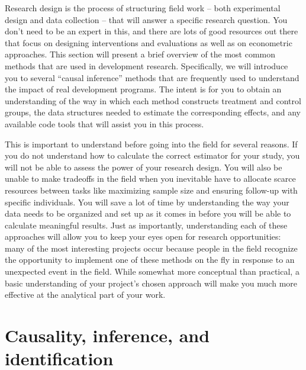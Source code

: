 
\begin{fullwidth}
Research design is the process of structuring field work
-- both experimental design and data collection --
that will answer a specific research question.
You don't need to be an expert in this,
and there are lots of good resources out there
that focus on designing interventions and evaluations
as well as on econometric approaches.
This section will present a brief overview
of the most common methods that are used in development research.
Specifically, we will introduce you to several ``causal inference'' methods
that are frequently used to understand the impact of real development programs.
The intent is for you to obtain an understanding of
the way in which each method constructs treatment and control groups,
the data structures needed to estimate the corresponding effects,
and any available code tools that will assist you in this process.

This is important to understand before going into the field for several reasons.
If you do not understand how to calculate the correct estimator for your study,
you will not be able to assess the power of your research design.
You will also be unable to make tradeoffs in the field
when you inevitable have to allocate scarce resources
between tasks like maximizing sample size
and ensuring follow-up with specific individuals.
You will save a lot of time by understanding the way
your data needs to be organized and set up as it comes in
before you will be able to calculate meaningful results.
Just as importantly, understanding each of these approaches
will allow you to keep your eyes open for research opportunities:
many of the most interesting projects occur because people in the field
recognize the opportunity to implement one of these methods on the fly
in response to an unexpected event in the field.
While somewhat more conceptual than practical,
a basic understanding of your project's chosen approach will make you
much more effective at the analytical part of your work.
\end{fullwidth}


\section{Causality, inference, and identification}

